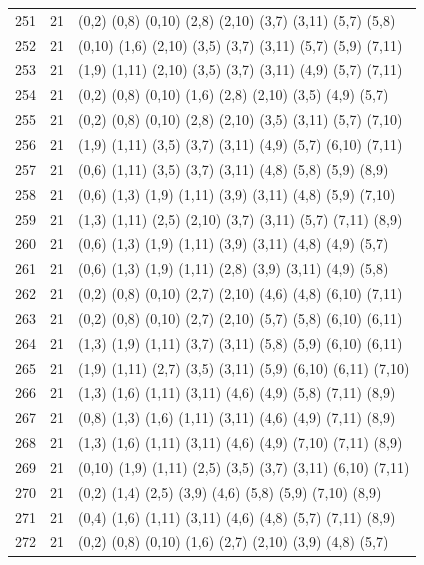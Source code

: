\begin{appendix}
{\begin{longtable}{lll}
251& 21 & (0,2)   (0,8)  (0,10) (2,8)   (2,10)  (3,7)   (3,11)  (5,7)   (5,8)\\
252& 21 & (0,10)  (1,6)  (2,10) (3,5)   (3,7)   (3,11)  (5,7)   (5,9)   (7,11)\\
253& 21 & (1,9)   (1,11) (2,10) (3,5)   (3,7)   (3,11)  (4,9)   (5,7)   (7,11)\\
254& 21 & (0,2)   (0,8)  (0,10) (1,6)   (2,8)   (2,10)  (3,5)   (4,9)   (5,7)\\
255& 21 & (0,2)   (0,8)  (0,10) (2,8)   (2,10)  (3,5)   (3,11)  (5,7)   (7,10)\\
256& 21 & (1,9)   (1,11) (3,5)  (3,7)   (3,11)  (4,9)   (5,7)   (6,10)  (7,11)\\
257& 21 & (0,6)   (1,11) (3,5)  (3,7)   (3,11)  (4,8)   (5,8)   (5,9)   (8,9)\\
258& 21 & (0,6)   (1,3)  (1,9)  (1,11)  (3,9)   (3,11)  (4,8)   (5,9)   (7,10)\\
259& 21 & (1,3)   (1,11) (2,5)  (2,10)  (3,7)   (3,11)  (5,7)   (7,11)  (8,9)\\
260& 21 & (0,6)   (1,3)  (1,9)  (1,11)  (3,9)   (3,11)  (4,8)   (4,9)   (5,7)\\
261& 21 & (0,6)   (1,3)  (1,9)  (1,11)  (2,8)   (3,9)   (3,11)  (4,9)   (5,8)\\
262& 21 & (0,2)   (0,8)  (0,10) (2,7)   (2,10)  (4,6)   (4,8)   (6,10)  (7,11)\\
263& 21 & (0,2)   (0,8)  (0,10) (2,7)   (2,10)  (5,7)   (5,8)   (6,10)  (6,11)\\
264& 21 & (1,3)   (1,9)  (1,11) (3,7)   (3,11)  (5,8)   (5,9)   (6,10)  (6,11)\\
265& 21 & (1,9)   (1,11) (2,7)  (3,5)   (3,11)  (5,9)   (6,10)  (6,11)  (7,10)\\
266& 21 & (1,3)   (1,6)  (1,11) (3,11)  (4,6)   (4,9)   (5,8)   (7,11)  (8,9)\\
267& 21 & (0,8)   (1,3)  (1,6)  (1,11)  (3,11)  (4,6)   (4,9)   (7,11)  (8,9)\\
268& 21 & (1,3)   (1,6)  (1,11) (3,11)  (4,6)   (4,9)   (7,10)  (7,11)  (8,9)\\
269& 21 & (0,10)  (1,9)  (1,11) (2,5)   (3,5)   (3,7)   (3,11)  (6,10)  (7,11)\\
270& 21 & (0,2)   (1,4)  (2,5)  (3,9)   (4,6)   (5,8)   (5,9)   (7,10)  (8,9)\\
271& 21 & (0,4)   (1,6)  (1,11) (3,11)  (4,6)   (4,8)   (5,7)   (7,11)  (8,9)\\
272& 21 & (0,2)   (0,8)  (0,10) (1,6)   (2,7)   (2,10)  (3,9)   (4,8)   (5,7)\\

\end{longtable}}
\end{appendix}
